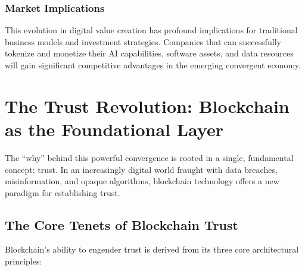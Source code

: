 \documentclass[11pt,a4paper]{report}
\begin{document}
\subsection{Market Implications}

This evolution in digital value creation has profound implications for traditional business models and investment strategies. Companies that can successfully tokenize and monetize their AI capabilities, software assets, and data resources will gain significant competitive advantages in the emerging convergent economy.

\chapter{The Trust Revolution: Blockchain as the Foundational Layer}

The ``why'' behind this powerful convergence is rooted in a single, fundamental concept: trust. In an increasingly digital world fraught with data breaches, misinformation, and opaque algorithms, blockchain technology offers a new paradigm for establishing trust.

\section{The Core Tenets of Blockchain Trust}

Blockchain's ability to engender trust is derived from its three core architectural principles:
\end{document}
